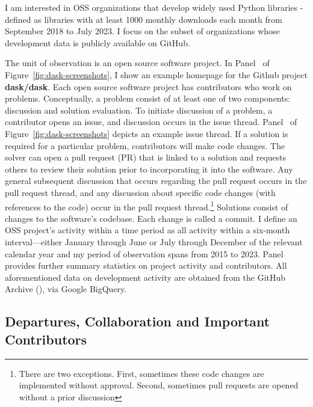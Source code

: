 \documentclass[12pt,notitlepage]{article}
\begin{document}
I am interested in OSS organizations that develop widely used Python libraries - defined as libraries with at least 1000 monthly downloads each month from September 2018 to July 2023. I focus on the subset of organizations whose development data is publicly available on GitHub. 

The unit of observation is an open source software project. In Panel~ of Figure~\ref{fig:dask-screenshots}, I show an example homepage for the Github project \textbf{dask/dask}. Each open source software project has contributors who work on problems. Conceptually, a problem consist of at least one of two components: discussion and solution evaluation. To initiate discussion of a problem, a contributor opens an issue, and discussion occurs in the issue thread. Panel~ of Figure~\ref{fig:dask-screenshots} depicts an example issue thread. If a solution is required for a particular problem, contributors will make code changes. The solver can open a pull request (PR) that is linked to a solution and requests others to review their solution prior to incorporating it into the software. Any general subsequent discussion that occurs regarding the pull request occurs in the pull request thread, and any discussion about specific code changes (with references to the code) occur in the pull request thread.\footnote{There are two exceptions. First, sometimes these code changes are implemented without approval. Second, sometimes pull requests are opened without a prior discussion} Solutions consist of changes to the software's codebase. Each change is called a commit. I define an OSS project’s activity within a time period as all activity within a six-month interval—either January through June or July through December of the relevant calendar year and my period of observation spans from 2015 to 2023. Panel~ provides further summary statistics on project activity and contributors. All aforementioned data on development activity are obtained from the GitHub Archive (\cite{github_archive_github_2025}), via Google BigQuery.


\subsection{Departures, Collaboration and Important Contributors}
\end{document}
